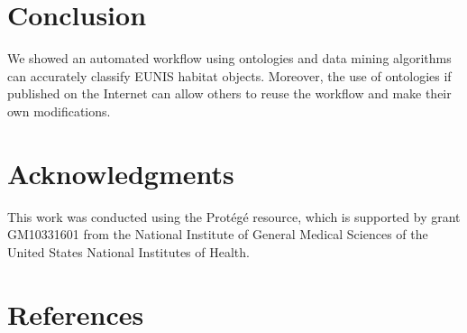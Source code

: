 \documentclass[authoryear, review,12pt,number]{elsarticle}
\begin{document}
\section{Conclusion}
We showed an automated workflow using ontologies and data mining algorithms can
accurately classify EUNIS habitat objects. Moreover, the use of ontologies if
published on the Internet can allow others to reuse the workflow and make their own
modifications.
\section{Acknowledgments}
This work was conducted using the Prot\'eg\'e resource, which
is supported by grant GM10331601 from the National Institute of General
Medical Sciences of the United States National Institutes of Health.

\section{References}

\end{document}
